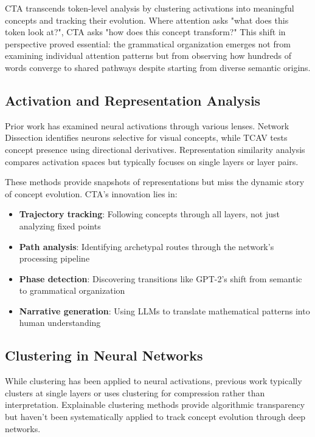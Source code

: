 CTA transcends token-level analysis by clustering activations into meaningful concepts and tracking their evolution. Where attention asks "what does this token look at?", CTA asks "how does this concept transform?" This shift in perspective proved essential: the grammatical organization emerges not from examining individual attention patterns but from observing how hundreds of words converge to shared pathways despite starting from diverse semantic origins.

\subsection{Activation and Representation Analysis}

Prior work has examined neural activations through various lenses. Network Dissection \citep{bau2017} identifies neurons selective for visual concepts, while TCAV \citep{kim2018} tests concept presence using directional derivatives. Representation similarity analysis \citep{kornblith2019, raghu2017} compares activation spaces but typically focuses on single layers or layer pairs.

These methods provide snapshots of representations but miss the dynamic story of concept evolution. CTA's innovation lies in:
\begin{itemize}
    \item \textbf{Trajectory tracking}: Following concepts through all layers, not just analyzing fixed points
    \item \textbf{Path analysis}: Identifying archetypal routes through the network's processing pipeline
    \item \textbf{Phase detection}: Discovering transitions like GPT-2's shift from semantic to grammatical organization
    \item \textbf{Narrative generation}: Using LLMs to translate mathematical patterns into human understanding
\end{itemize}

\subsection{Clustering in Neural Networks}

While clustering has been applied to neural activations, previous work typically clusters at single layers or uses clustering for compression rather than interpretation. Explainable clustering methods \citep{dasgupta2020} provide algorithmic transparency but haven't been systematically applied to track concept evolution through deep networks.


